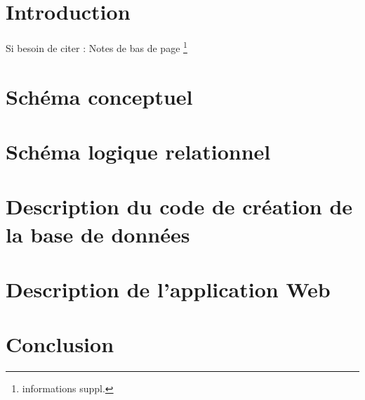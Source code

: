 \documentclass[a4paper,12pt]{article}
\begin{document}
\section{Introduction}

Si besoin de citer : \parencite[2--4]{SOURCE}
Notes de bas de page \footnote{informations suppl.}

\section{Schéma conceptuel}

\section{Schéma logique relationnel}

\section{Description du code de création de la base de données}

\section{Description de l'application Web}

\section{Conclusion}

\newpage

%
%

\end{document}
